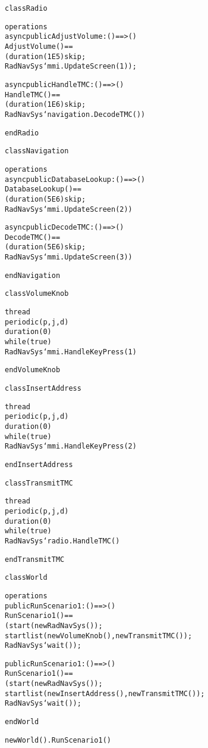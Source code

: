 \begin{alltt}
class Radio

operations
  async public AdjustVolume: () ==> ()
  AdjustVolume () ==
    ( duration (1E5) skip;
      RadNavSys`mmi.UpdateScreen(1) );

  async public HandleTMC: () ==> ()
  HandleTMC () ==
    ( duration (1E6) skip;
      RadNavSys`navigation.DecodeTMC() )

end Radio
\end{alltt}

\begin{alltt}
class Navigation

operations
  async public DatabaseLookup: () ==> ()
  DatabaseLookup () ==
    ( duration (5E6) skip;
      RadNavSys`mmi.UpdateScreen(2) )

  async public DecodeTMC: () ==> ()
  DecodeTMC () ==
    ( duration (5E6) skip;
      RadNavSys`mmi.UpdateScreen(3) )

end Navigation
\end{alltt}

\begin{alltt}
class VolumeKnob

thread
  periodic (p,j,d)
    duration (0)
      while (true)
        RadNavSys`mmi.HandleKeyPress(1)

end VolumeKnob
\end{alltt}

\begin{alltt}
class InsertAddress

thread
  periodic (p,j,d)
    duration (0)
      while (true)
        RadNavSys`mmi.HandleKeyPress(2)

end InsertAddress
\end{alltt}

\begin{alltt}
class TransmitTMC

thread
  periodic (p,j,d)
    duration (0)
      while (true)
        RadNavSys`radio.HandleTMC()

end TransmitTMC
\end{alltt}

\begin{alltt}
class World

operations
  public RunScenario1 : () ==> ()
  RunScenario1 () ==
    ( start(new RadNavSys());
      startlist({new VolumeKnob(), new TransmitTMC()});
      RadNavSys`wait() );

  public RunScenario1 : () ==> ()
  RunScenario1 () ==
    ( start(new RadNavSys());
      startlist({new InsertAddress(), new TransmitTMC()});
      RadNavSys`wait() );

end World
\end{alltt}

\begin{alltt}
new World().RunScenario1()
\end{alltt}
